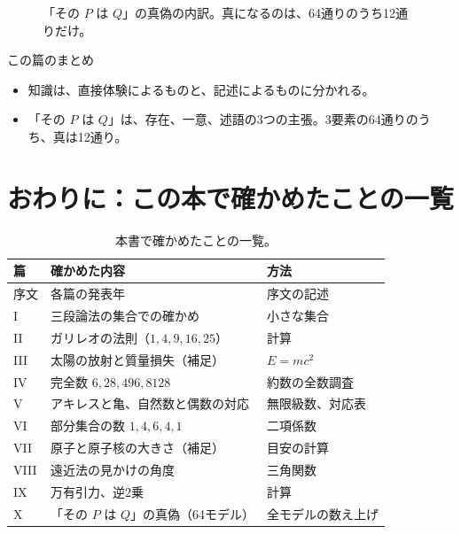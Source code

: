 \documentclass[a4paper,11pt,openany]{ltjsbook}
\begin{document}
\begin{figure}[htbp]
\centering
{}
\caption{「その $P$ は $Q$」の真偽の内訳。真になるのは、64通りのうち12通りだけ。}
\end{figure}

\begin{pointbox}{この篇のまとめ}
\begin{itemize}[leftmargin=*]
\item 知識は、直接体験によるものと、記述によるものに分かれる。
\item 「その $P$ は $Q$」は、存在、一意、述語の3つの主張。3要素の64通りのうち、真は12通り。
\end{itemize}
\end{pointbox}

\chapter*{おわりに：この本で確かめたことの一覧}

\begin{table}[htbp]
\centering
\small
\begin{tabular}{lll}
\toprule
篇 & 確かめた内容 & 方法\\
\midrule
序文 & 各篇の発表年 & 序文の記述\\
I & 三段論法の集合での確かめ & 小さな集合\\
II & ガリレオの法則（$1,4,9,16,25$） & 計算\\
III & 太陽の放射と質量損失（補足） & $E=mc^2$\\
IV & 完全数 $6,28,496,8128$ & 約数の全数調査\\
V & アキレスと亀、自然数と偶数の対応 & 無限級数、対応表\\
VI & 部分集合の数 $1,4,6,4,1$ & 二項係数\\
VII & 原子と原子核の大きさ（補足） & 目安の計算\\
VIII & 遠近法の見かけの角度 & 三角関数\\
IX & 万有引力、逆2乗 & 計算\\
X & 「その $P$ は $Q$」の真偽（64モデル） & 全モデルの数え上げ\\
\bottomrule
\end{tabular}
\caption{本書で確かめたことの一覧。}
\end{table}
\end{document}
